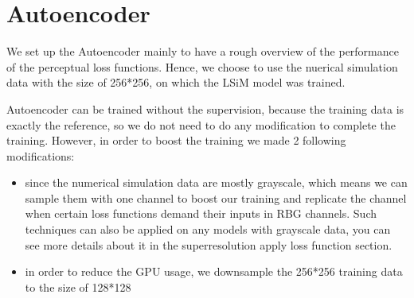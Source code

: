 \documentclass[a4paper,12pt,twoside]{report}
\begin{document}
\section{Autoencoder}
We set up the Autoencoder mainly to have a rough overview of the performance of the perceptual loss functions. Hence, we choose to use the nuerical simulation data with the size of 256*256, on which the LSiM model was trained. 

Autoencoder can be trained without the supervision, because the training data is exactly the reference, so we do not need to do any modification to complete the training. However, in order to boost the training we made 2 following modifications:
\begin{itemize}
\item since the numerical simulation data are mostly grayscale, which means we can sample them with one channel to boost our training and replicate the channel when certain loss functions demand their inputs in RBG channels. Such techniques can also be applied on any models with grayscale data, you can see more details about it in the superresolution apply loss function section.
\item in order to reduce the GPU usage, we downsample the 256*256 training data to the size of 128*128

\end{itemize}
\end{document}
